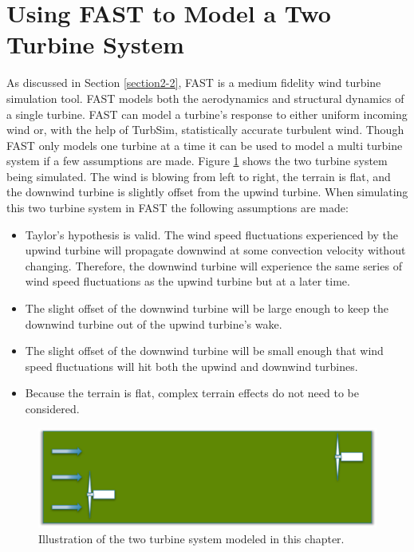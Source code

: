 
\section{Using FAST to Model a Two Turbine System} \label{section3-2}

As discussed in Section \ref{section2-2}, FAST is a medium fidelity wind turbine simulation tool. FAST models both the aerodynamics and structural dynamics of a single turbine. FAST can model a turbine's response to either uniform incoming wind or, with the help of TurbSim, statistically accurate turbulent wind. Though FAST only models one turbine at a time it can be used to model a multi turbine system if a few assumptions are made. Figure \ref{fig3-5} shows the two turbine system being simulated. The wind is blowing from left to right, the terrain is flat, and the downwind turbine is slightly offset from the upwind turbine. When simulating this two turbine system in FAST the following assumptions are made:

\begin{itemize}
  \item Taylor's hypothesis is valid. The wind speed fluctuations experienced by the upwind turbine will propagate downwind at some convection velocity without changing. Therefore, the downwind turbine will experience the same series of wind speed fluctuations as the upwind turbine but at a later time.
  \item The slight offset of the downwind turbine will be large enough to keep the downwind turbine out of the upwind turbine's wake.
  \item The slight offset of the downwind turbine will be small enough that wind speed fluctuations will hit both the upwind and downwind turbines.
  \item Because the terrain is flat, complex terrain effects do not need to be considered.
\end{itemize}


 \begin{figure}[htb]
	\centering
		\includegraphics[width=\linewidth]{Figures/ch3Figures/fig3-5.png}
		
	\caption{Illustration of the two turbine system modeled in this chapter.}
	\label{fig3-5}
\end{figure}

